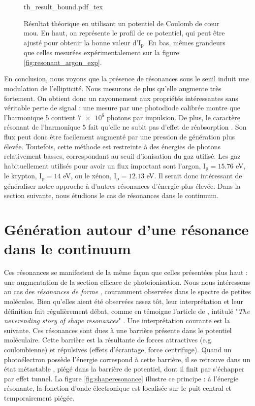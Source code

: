 \begin{figure}[!ht]
\centering
\def\svgwidth{1\columnwidth}
{th_result_bound.pdf_tex}
\caption{Résultat théorique en utilisant un potentiel de Coulomb de cœur mou. En haut, on représente le profil de ce potentiel, qui peut être ajusté pour obtenir la bonne valeur d'$\text{I}_{\text{p}}$. En bas, mêmes grandeurs que celles mesurées expérimentalement sur la figure \ref{fig:resonant_argon_exp}.}
\label{fig:resonant_argon_th_bound}
\end{figure}

En conclusion, nous voyons que la présence de résonances sous le seuil induit une modulation de l'ellipticité. Nous mesurons de plus qu'elle augmente très fortement. On obtient donc un rayonnement aux propriétés intéressantes sans véritable perte de signal : une mesure par une photodiode calibrée montre que l'harmonique 5 contient $\num{7e6}$ photons par impulsion. De plus, le caractère résonant de l'harmonique 5 fait qu'elle ne subit pas d'effet de réabsorption . Son flux peut donc être facilement augmenté par une pression de génération plus élevée.  Toutefois, cette méthode est restreinte à des énergies de photons relativement basses, correspondant au seuil d'ionisation du gaz utilisé. Les gaz habituellement utilisés pour avoir un flux important sont l'argon, $\text{I}_{\text{p}}=15.76$ eV, le krypton, $\text{I}_{\text{p}}=14$ eV, ou le xénon, $\text{I}_{\text{p}}=12.13$ eV. Il serait donc intéressant de généraliser notre approche à d'autres résonances d'énergie plus élevée. Dans la section suivante, nous étudions le cas de résonances dans le continuum.

\section{Génération autour d'une résonance dans le continuum}
Ces résonances se manifestent de la même façon que celles présentées plus haut : une augmentation de la section efficace de photoionisation. Nous nous intéressons au cas des \textit{résonances de forme} , couramment observées dans le spectre de petites molécules. Bien qu'elles aient été observées assez tôt, leur interprétation et leur définition fait régulièrement débat, comme en témoigne l'article de , intitulé "\textit{The neverending story of shape resonances}" . Une interprétation courante est la suivante. Ces résonances sont dues à une barrière présente dans le potentiel moléculaire. Cette barrière est la résultante de forces attractives (e.g. coulombienne) et répulsives (effets d'écrantage, force centrifuge). Quand un photoélectron possède l'énergie correspond à cette barrière, il se retrouve dans un état métastable , piégé dans la barrière de potentiel, dont il finit par s'échapper par effet tunnel. La figure \ref{fig:shaperesonance} illustre ce principe : à l'énergie résonante, la fonction d'onde électronique est localisée sur le puit central et temporairement piégée.


